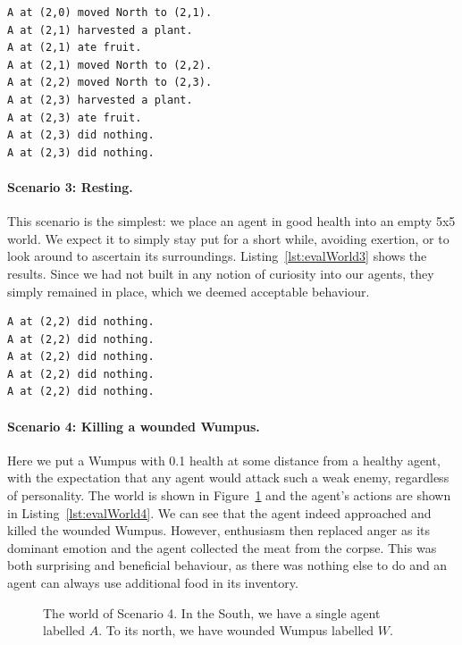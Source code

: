 \begin{lstlisting}[caption=Actions in Scenario 2., label=lst:evalWorld2, float=t]
A at (2,0) moved North to (2,1).
A at (2,1) harvested a plant.
A at (2,1) ate fruit.
A at (2,1) moved North to (2,2).
A at (2,2) moved North to (2,3).
A at (2,3) harvested a plant.
A at (2,3) ate fruit.
A at (2,3) did nothing.
A at (2,3) did nothing.
\end{lstlisting}

\paragraph{Scenario 3: Resting.} This scenario is the simplest: we place an agent in good health into an empty 5x5 world. We expect it to simply stay put for a short while, avoiding exertion, or to look around to ascertain its surroundings. Listing~\ref{lst:evalWorld3} shows the results. Since we had not built in any notion of curiosity into our agents, they simply remained in place, which we deemed acceptable behaviour.

\begin{lstlisting}[caption=Actions in Scenario 3., label=lst:evalWorld3, float=t]
A at (2,2) did nothing.
A at (2,2) did nothing.
A at (2,2) did nothing.
A at (2,2) did nothing.
A at (2,2) did nothing.
\end{lstlisting}

\paragraph{Scenario 4: Killing a wounded Wumpus.} Here we put a Wumpus with 0.1 health at some distance from a healthy agent, with the expectation that any agent would attack such a weak enemy, regardless of personality. The world is shown in Figure~\ref{fig:evalWorld4} and the agent's actions are shown in Listing~\ref{lst:evalWorld4}. We can see that the agent indeed approached and killed the wounded Wumpus. However, enthusiasm then replaced anger as its dominant emotion and the agent collected the meat from the corpse. This was both surprising and beneficial behaviour, as there was nothing else to do and an agent can always use additional food in its inventory.

\begin{figure}[t]
	\centering
	
	\caption{The world of Scenario 4. In the South, we have a single agent labelled $A$. To its north, we have wounded Wumpus labelled $W$.}
	\label{fig:evalWorld4}
\end{figure}

